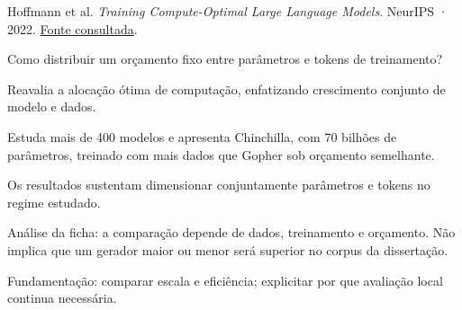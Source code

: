 {\small Hoffmann et al. \textit{Training Compute-Optimal Large Language Models}. NeurIPS · 2022. \href{https://proceedings.neurips.cc/paper_files/paper/2022/file/c1e2faff6f588870935f114ebe04a3e5-Paper-Conference.pdf}{Fonte consultada}.\par}

Como distribuir um orçamento fixo entre parâmetros e tokens de treinamento?

Reavalia a alocação ótima de computação, enfatizando crescimento conjunto de modelo e dados.

Estuda mais de 400 modelos e apresenta Chinchilla, com 70 bilhões de parâmetros, treinado com mais dados que Gopher sob orçamento semelhante.

Os resultados sustentam dimensionar conjuntamente parâmetros e tokens no regime estudado.

\begin{itemize}
\end{itemize}

Análise da ficha: a comparação depende de dados, treinamento e orçamento. Não implica que um gerador maior ou menor será superior no corpus da dissertação.

Fundamentação: comparar escala e eficiência; explicitar por que avaliação local continua necessária.

